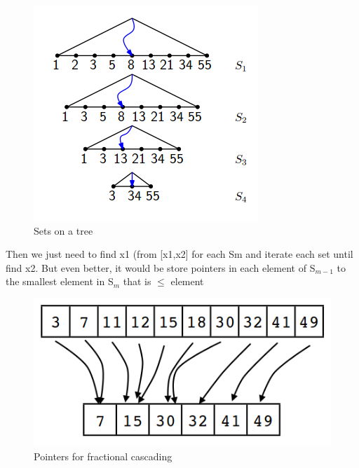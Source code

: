 \documentclass{article}
\begin{document}
\begin{figure}[H]
  \begin{center}
    \includegraphics[width=\textwidth]{imgs/fractional_cascading1.png}
    \caption{Sets on a tree}
    \label{fig:fractional_cascading1}
  \end{center}
\end{figure}

Then we just need to find x1 (from [x1,x2] for each Sm and iterate each set until find x2.
But even better, it would be store pointers in each element of S$_{m-1}$ to the smallest element in S$_m$ that is $\leq$ element

\begin{figure}[H]
  \begin{center}
    \includegraphics[width=\textwidth]{imgs/fractional_cascading2.png}
    \caption{Pointers for fractional cascading}
    \label{fig:fractional_cascading2}
  \end{center}
\end{figure}
\end{document}
